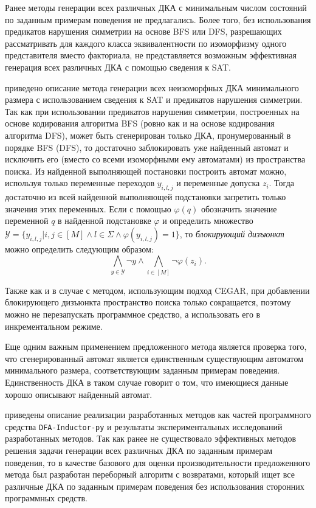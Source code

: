 Ранее методы генерации всех различных ДКА с минимальным числом состояний по заданным примерам поведения не предлагались. 
Более того, без использования предикатов нарушения симметрии на основе BFS или DFS, разрешающих рассматривать для каждого класса эквивалентности по изоморфизму одного представителя вместо факториала, не представляется возможным эффективная генерация всех различных ДКА с помощью сведения к SAT.

\insection{\ref{sec:findall:SAT-based}} приведено описание метода генерации всех неизоморфных ДКА минимального размера с использованием сведения к SAT и предикатов нарушения симметрии.
Так как при использовании предикатов нарушения симметрии, построенных на основе кодирования алгоритма BFS (ровно как и на основе кодирования алгоритма DFS), может быть сгенерирован только ДКА, пронумерованный в порядке BFS (DFS), то достаточно заблокировать уже найденный автомат и исключить его (вместо со всеми изоморфными ему автоматами) из пространства поиска.
Из найденной выполняющей постановки построить автомат можно, используя только переменные переходов $y_{i,l,j}$ и переменные допуска $z_{i}$.
Тогда достаточно из всей найденной выполняющей подстановки запретить только значения этих переменных.
Если с помощью $\varphi\left(q\right)$ обозначить значение переменной $q$ в найденной подстановке $\varphi$ и определить множество $\mathcal{Y} = \{y_{i,l,j} | i,j \in \left[M\right] \wedge l \in \Sigma \wedge \varphi\left(y_{i,l,j}\right) = 1\}$, то \emph{блокирующий дизъюнкт} можно определить следующим образом:
\begin{equation*}
\bigwedge_{y \in \mathcal{Y}} \neg y \wedge \bigwedge_{i \in \left[M\right]}\neg \varphi\left(z_{i}\right).
\end{equation*}

Также как и в случае с методом, использующим подход CEGAR, при добавлении блокирующего дизъюнкта пространство поиска только сокращается, поэтому можно не перезапускать программное средство, а использовать его в инкрементальном режиме.

Еще одним важным применением предложенного метода является проверка того, что сгенерированный автомат является единственным существующим автоматом минимального размера, соответствующим заданным примерам поведения.
Единственность ДКА в таком случае говорит о том, что имеющиеся данные хорошо описывают найденный автомат.

\insection{\ref{sec:findall:results}} приведены описание реализации разработанных методов как частей программного средства \texttt{DFA-Inductor-py} и результаты экспериментальных исследований разработанных методов. 
Так как ранее не существовало эффективных методов решения задачи генерации всех различных ДКА по заданным примерам поведения, то в качестве базового для оценки производительности предложенного метода был разработан переборный алгоритм с возвратами, который ищет все различные ДКА по заданным примерам поведения без использования сторонних программных средств.


